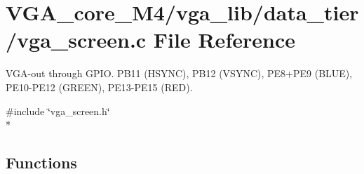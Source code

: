 \section{V\+G\+A\+\_\+core\+\_\+\+M4/vga\+\_\+lib/data\+\_\+tier/vga\+\_\+screen.c File Reference}
\label{vga__screen_8c}


V\+G\+A-\/out through G\+P\+IO. P\+B11 (H\+S\+Y\+NC), P\+B12 (V\+S\+Y\+NC), P\+E8+\+P\+E9 (B\+L\+UE), P\+E10-\/\+P\+E12 (G\+R\+E\+EN), P\+E13-\/\+P\+E15 (R\+ED).  


{\ttfamily \#include \char`\"{}vga\+\_\+screen.\+h\char`\"{}}\\*
\subsection*{Functions}
